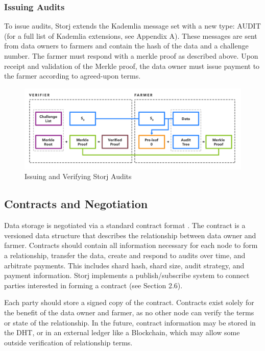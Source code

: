\documentclass[a4paper,10pt]{article}
\begin{document}
\subsubsection{Issuing Audits}
To issue audits, Storj extends the Kademlia message set with a new type: AUDIT (for a full list of Kademlia extensions, see Appendix A). These messages are sent from data owners to farmers and contain the hash of the data and a challenge number. The farmer must respond with a merkle proof as described above. Upon receipt and validation of the Merkle proof, the data owner must issue payment to the farmer according to agreed-upon terms.

\begin{figure}[hbt]
\centering
\includegraphics[width=\linewidth]{4}
\caption{Issuing and Verifying Storj Audits}
\end{figure}

\subsection{Contracts and Negotiation}
Data storage is negotiated via a standard contract format \cite{7}. The contract is a versioned data structure that describes the relationship between data owner and farmer. Contracts should contain all information necessary for each node to form a relationship, transfer the data, create and respond to audits over time, and arbitrate payments. This includes shard hash, shard size, audit strategy, and payment information. Storj implements a publish/subscribe system to connect parties interested in forming a contract (see Section 2.6).

Each party should store a signed copy of the contract. Contracts exist solely for the benefit of the data owner and farmer, as no other node can verify the terms or state of the relationship. In the future, contract information may be stored in the DHT, or in an external ledger like a Blockchain, which may allow some outside verification of relationship terms.
\end{document}
